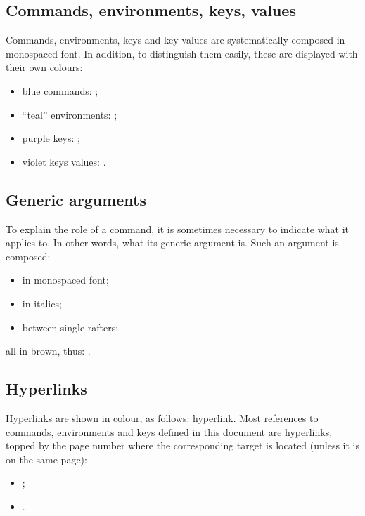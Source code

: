 \documentclass[english,nolocaltoc]{nwejmart}
\newtheorem[style=definition]{fact}
\newtheorem[title-plural=Criteria]{criterion}
\newtheorem[title=random experiment]{rexp}
\begin{document}
\subsection{Commands, environments, keys, values}\label{sec-comm-envir-cles}

Commands, environments, keys and key values are systematically composed
in monospaced font. In addition, to distinguish them easily, these are
displayed with their own colours: 
\begin{itemize}
\item blue commands: ;
\item \enquote{teal} environments:
  ;
\item purple keys: ;
\item violet keys values: .
\end{itemize}

\subsection{Generic arguments}
\label{sec-arguments-generiques}

To explain the role of a command, it is sometimes necessary to
indicate what it applies to. In other words, what its generic argument
is.  Such an argument is composed:
\begin{itemize}
\item in monospaced  font;
\item in italics;
\item between single rafters;
\end{itemize}
all in brown, thus: .

\subsection{Hyperlinks}
\label{sec-liens-hypertextes}

Hyperlinks are shown in colour, as follows:
\href{http://gte.univ-littoral.fr/members/dbitouze/pub/latex}{hyperlink}. Most
references to commands, environments and keys defined in this document
are hyperlinks, topped by the page number where the corresponding
target is located (unless it is on the same page):
\begin{itemize}
\item {};
\item {}.
\end{itemize}
\end{document}
